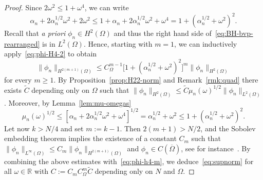\documentclass[a4paper, reqno,titlepage]{amsart}
\numberwithin{equation}{section}
\theoremstyle{plain}
\theoremstyle{definition}
\theoremstyle{remark}
\newcommand{\RR}{\mathbb{R}}
\begin{document}
\begin{proof}
  Since $2\omega^2\leq 1+\omega^4$, we can write
  \begin{equation*}
    \alpha_n + 2\alpha_n^{1/2}\omega^2 + 2\omega^2
    \leq  1+\alpha_n + 2\alpha_n^{1/2}\omega^2 + \omega^4
    =1+(\alpha_n^{1/2}+\omega^2)^2.
  \end{equation*}
  Recall that \emph{a priori} $\phi_n\in H^2(\Omega)$ and thus the right hand side of~\eqref{eq:BH-bvp-rearranged} is in $L^2(\Omega)$. Hence, starting with $m=1$, we can inductively apply~\eqref{eq:phi-H4-2} to obtain
  \begin{equation}
    \label{eq:phi-h4-m}
    \| \phi_n \|_{H^{2(m+1)}(\Omega)}
    \leq C_\Omega^{m-1} \bigl[1+(\alpha_n^{1/2}+\omega^2)^2\bigr]^{m} \| \phi_n \|_{H^2(\Omega)}
  \end{equation}
  for every $m\geq 1$. By Proposition~\ref{prop:H22-norm} and Remark~\ref{rmk:quad} there exists $\widetilde{C}$ depending only on $\Omega$ such that $\| \phi_n \|_{H^2(\Omega)} \leq \widetilde{C} \mu_n(\omega)^{1/2}\| \phi_n \|_{L^2(\Omega)}$. Moreover, by Lemma~\ref{lem:mu-omegas}
  \begin{equation*}
    \mu_n(\omega)^{1/2}
    \leq [\alpha_n+2\alpha_n^{1/2}\omega^2+\omega^4]^{1/2}
    =\alpha_n^{1/2}+\omega^2
    \leq 1+(\alpha_n^{1/2}+\omega^2)^2.
  \end{equation*}
  Let now $k>N/4$ and set $m:=k-1$. Then $2(m+1)>N/2$, and the Sobolev embedding theorem implies the existence of a constant $C_m$ such that $\| \phi_n \|_{L^\infty(\Omega)} \leq C_m \| \phi_n \|_{H^{2(m+1)}(\Omega)}$ and $\phi_n \in C(\overline\Omega)$, see for instance~\cite[Theorem 7.26]{GT}. By combining the above estimates with~\eqref{eq:phi-h4-m}, we deduce~\eqref{eq:supnorm} for all $\omega\in\RR$ with $C := C_m C_\Omega^{m} \widetilde{C}$ depending only on $N$ and $\Omega$.
\end{proof}
\end{document}
